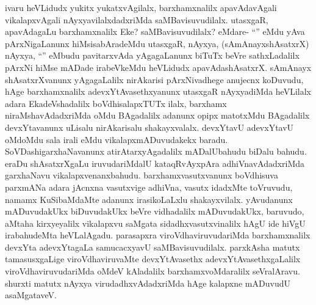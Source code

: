 \begin{artha}
ivaru heVLidudx yukitx yukatxvAgilalx, barxhamxnalilx apavAdavAgali vikalapxvAgali nAyxyavilalxdadxriMda saMBavisuvudilalx. utasxgaR, apavAdagaLu barxhamxnalilx Eke? saMBavisuvudilalx? eMdare- ``\stext'' eMdu yAva pArxNigaLanunx hiMsisabAradeMdu utasxgaR, nAyxya, (sAmAnayxshAsatxrX) nAyxya, ``\stext'' eMbudu pavitarxvAda yAgagaLanunx biTuTx beVre sathxLadalilx pArxNi hiMse mADade irabeVkeMdu heVLidudx apavAdashAsatxrX. sAmAnayx shAsatxrXvanunx yAgagaLalilx nirAkarisi pArxNivadhege anujecnx koDuvudu, hAge barxhamxnalilx adevxYtAvasethxyanunx utasxgaR nAyxyadiMda heVLilalx adara EkadeVshadalilx boVdhisalapxTUTx ilalx, barxhamx niraMshavAdadxriMda oMdu BAgadalilx adanunx opipx matotxMdu BAgadalilx devxYtavanunx uLisalu nirAkarisalu shakayxvalalx. devxYtavU adevxYtavU oMdoMdu sala irali eMdu vikalapxmADuvudakekx baradu. SoVDashigarxhaNavanunx atirAtarxyAgadalilx mADalUbahudu biDalu bahudu. eraDu shAsatxrXgaLu iruvudariMdalU kataqRvAyxpAra adhiVnavAdadxriMda garxhaNavu vikalapxvenanxbahudu. barxhamxvasutxvanunx boVdhisuva parxmANa adara jAcnxna vasutxvige adhiVna, vasutx idadxMte toVruvudu, namamx KuSibaMdaMte adanunx irasikoLaLxlu shakayxvilalx. yAvudanunx mADuvudakUkx biDuvudakUkx beVre vidhadalilx mADuvudakUkx, baruvudo, aMtaha kirxyeyalilx vikalapxvu saMgata sidadhxvasutxvinalilx hAgU ide hiVgU irabahudeMta heVLalAgadu. parasapxra viroVdhaviruvudariMda barxhamxnalilx devxYta adevxYtagaLa samucacxyavU saMBavisuvudilalx. parxkAsha matutx tamasusxgaLige viroVdhaviruvaMte devxYtAvasethx adevxYtAvasethxgaLalilx viroVdhaviruvudariMda oMdeV kAladalilx barxhamxvoMdaralilx seVralAravu. shurxti matutx nAyxya virudadhxvAdadxriMda hAge kalapxne mADuvudU asaMgataveV.
\end{artha}

